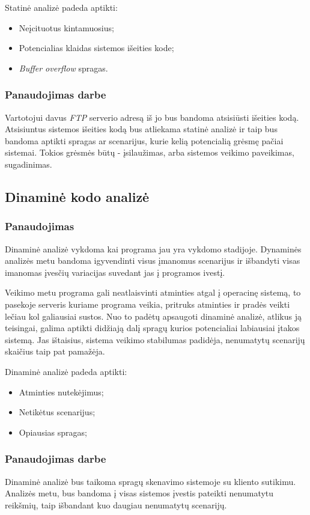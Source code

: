 \documentclass[a4paper,12pt,fleqn]{article}
\begin{document}
Statinė analizė padeda aptikti:
\begin{itemize}
	\item Neįcituotus kintamuosius;
	\item Potencialias klaidas sistemos išeities kode;
	\item \textit{Buf{}fer overflow} spragas.
\end{itemize}


\subsubsection{Panaudojimas darbe}
\label{sec:data}
Vartotojui davus \textit{FTP} serverio adresą iš jo bus bandoma atsisiūsti išeities kodą. Atsisiuntus sistemos išeities kodą bus atliekama statinė analizė ir taip bus bandoma aptikti spragas ar scenarijus, kurie kelią potencialią grėsmę pačiai sistemai. Tokios grėsmės būtų - įsilaužimas, arba sistemos veikimo paveikimas, sugadinimas. 
\subsection{Dinaminė kodo analizė}
\label{sec:example}


\subsubsection{Panaudojimas}
\label{sec:data}
Dinaminė analizė vykdoma kai programa jau yra vykdomo stadijoje. Dynaminės analizės metu bandoma igyvendinti visus įmanomus scenarijus ir išbandyti visas imanomas įvesčių variacijas suvedant jas į programos ivestį.

Veikimo metu programa gali neatlaisvinti atminties atgal į operacinę sistemą, to pasekoje serveris kuriame programa veikia, pritruks atminties ir pradės veikti lečiau kol galiausiai sustos. Nuo to padėtų apsaugoti dinaminė analizė, atlikus ją teisingai, galima aptikti didžiają dalį spragų kurios potencialiai labiausiai įtakos sistemą. Jas ištaisius, sistema veikimo stabilumas padidėja, nenumatytų scenarijų skaičius taip pat pamažėja.

Dinaminė analizė padeda aptikti:
\begin{itemize}
	\item Atminties nutekėjimus;
	\item Netikėtus scenarijus;
	\item Opiausias spragas;
\end{itemize}

\subsubsection{Panaudojimas darbe}
\label{sec:data}
Dinaminė analizė bus taikoma spragų skenavimo sistemoje su kliento sutikimu. Analizės metu, bus bandoma į visas sistemos įvestis pateikti nenumatytu reikšmių, taip išbandant kuo daugiau nenumatytų scenarijų.
\end{document}
